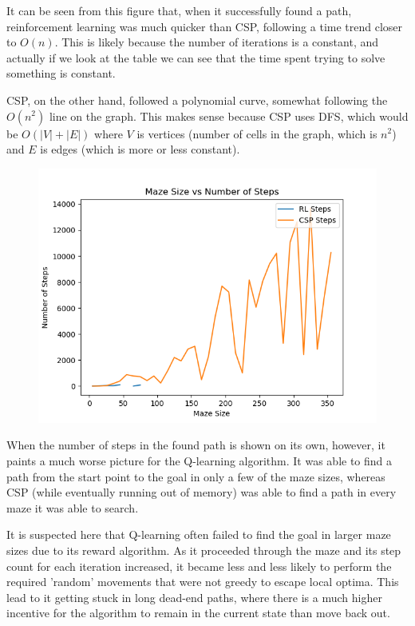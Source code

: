 \documentclass{article}
\newcommand\tab[1][1cm]{\hspace*{#1}}
\begin{document}
         \tab It can be seen from this figure that, when it successfully found a 
         path, reinforcement learning was much quicker than CSP, following a 
         time trend closer to $O(n)$. This is likely because the number of
         iterations is a constant, and actually if we look at the table we can
         see that the time spent trying to solve something is constant. 

         \tab CSP, on the other hand, followed a polynomial curve, somewhat 
         following the $O(n^2)$ line on the graph. This makes sense because CSP 
         uses DFS, which would be $O(|V|+|E|)$ where $V$ is vertices (number 
         of cells in the graph, which is $n^2$) and $E$ is edges (which is 
         more or less constant).

        \begin{figure}[h]
            \centering
            \includegraphics[scale=0.6]{assets/StepsOnly.png}
            \label{StepsOnly}
        \end{figure}

         \tab When the number of steps in the found path is shown on its own, 
         however, it paints a much worse picture for the Q-learning algorithm. 
         It was able to find a path from the start point to the goal in 
         only a few of the maze sizes, whereas CSP (while eventually 
         running out of memory) was able to find a path in every maze 
         it was able to search.

         \tab It is suspected here that Q-learning often failed to find the goal 
         in larger maze sizes due to its reward algorithm. As it proceeded 
         through the maze and its step count for each iteration increased, 
         it became less and less likely to perform the required 'random' 
         movements that were not greedy to escape local optima. This lead
         to it getting stuck in long dead-end paths, where there is a much 
         higher incentive for the algorithm to remain
         in the current state than move back out.
\end{document}
